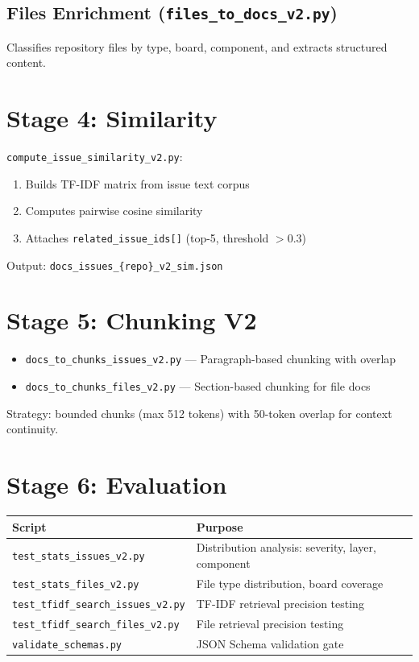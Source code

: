 \documentclass[12pt,a4paper]{report}
\begin{document}
\subsection{Files Enrichment (\texttt{files\_to\_docs\_v2.py})}

Classifies repository files by type, board, component, and extracts structured content.

\section{Stage 4: Similarity}

\texttt{compute\_issue\_similarity\_v2.py}:
\begin{enumerate}
  \item Builds TF-IDF matrix from issue text corpus
  \item Computes pairwise cosine similarity
  \item Attaches \texttt{related\_issue\_ids[]} (top-5, threshold $> 0.3$)
\end{enumerate}

Output: \texttt{docs\_issues\_\{repo\}\_v2\_sim.json}

\section{Stage 5: Chunking V2}

\begin{itemize}
  \item \texttt{docs\_to\_chunks\_issues\_v2.py} --- Paragraph-based chunking with overlap
  \item \texttt{docs\_to\_chunks\_files\_v2.py} --- Section-based chunking for file docs
\end{itemize}

Strategy: bounded chunks (max 512 tokens) with 50-token overlap for context continuity.

\section{Stage 6: Evaluation}

\begin{longtable}{p{5cm}p{8cm}}
\toprule
\textbf{Script} & \textbf{Purpose} \\
\midrule
\texttt{test\_stats\_issues\_v2.py} & Distribution analysis: severity, layer, component \\
\texttt{test\_stats\_files\_v2.py} & File type distribution, board coverage \\
\texttt{test\_tfidf\_search\_issues\_v2.py} & TF-IDF retrieval precision testing \\
\texttt{test\_tfidf\_search\_files\_v2.py} & File retrieval precision testing \\
\texttt{validate\_schemas.py} & JSON Schema validation gate \\
\bottomrule
\end{longtable}
\end{document}
